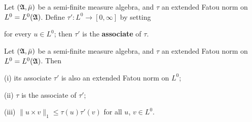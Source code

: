  Let $(\frak A,\bar\mu)$ be a
semi-finite measure algebra, and $\tau$ an extended Fatou norm on
$L^0=L^0(\frak A)$.   Define $\tau':L^0\to[0,\infty]$ by setting
     
     
\noindent for every $u\in L^0$;  then $\tau'$ is the {\bf associate} of
$\tau$.   
     
 Let $(\frak A,\bar\mu)$ be a semi-finite measure
algebra, and $\tau$ an extended Fatou norm on $L^0=L^0(\frak A)$.   Then
     
(i) its associate $\tau'$ is also an extended Fatou norm on $L^0$;
     
(ii) $\tau$ is the associate of $\tau'$;
     
(iii) $\|u\times v\|_1\le\tau(u)\tau'(v)$ for all $u$, $v\in L^0$.
     
